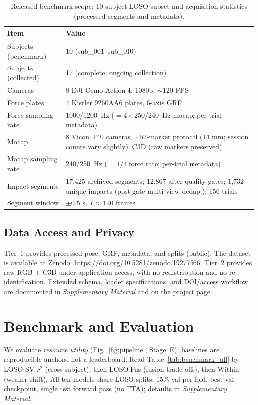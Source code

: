 \documentclass[sigconf,screen]{acmart}
\newcommand{\rateHz}[1]{\mbox{#1~Hz}}
\newcommand{\BadmintonGRFGitHubBase}{https://github.com/KenyaNiu/BadmintonGRF}
\newcommand{\BadmintonGRFRepoShort}{\href{\BadmintonGRFGitHubBase}{project page}}
\newcommand{\BadmintonGRFSupplementary}{\emph{Supplementary Material}}
\begin{document}
\begin{table}[t]
  \centering
  \small
  \setlength{\tabcolsep}{4pt}
  \renewcommand{\arraystretch}{1.05}
  \caption{Released benchmark scope: 10-subject LOSO subset and acquisition statistics (processed segments and metadata).}
  \label{tab:stats}
  \begin{tabularx}{\columnwidth}{@{}lX@{}}
    \toprule
    \textbf{Item} & \textbf{Value} \\
    \midrule
    Subjects (benchmark) & 10 (sub\_001--sub\_010) \\
    Subjects (collected) & 17 (complete; ongoing collection) \\
    Cameras & 8 DJI Osmo Action 4, 1080p, \(\sim\)120 FPS \\
    Force plates & 4 Kistler 9260AA6 plates, 6-axis GRF \\
    Force sampling rate & \rateHz{1000/1200} (\(=4\!\times\)\rateHz{250/240} mocap; per-trial metadata) \\
    Mocap & 8 Vicon T40 cameras, \(\sim\)52-marker protocol (14 mm; session counts vary slightly), C3D (raw markers preserved) \\
    Mocap sampling rate & \rateHz{240/250} (\(=1/4\) force rate; per-trial metadata) \\
    Impact segments & 17{,}425 archived segments; 12{,}867 after quality gates; 1{,}732 unique impacts (post-gate multi-view dedup.); 156 trials \\
    Segment window & \(\pm 0.5\) s, \(T\approx 120\) frames \\
    \bottomrule
  \end{tabularx}
\end{table}

\subsection{Data Access and Privacy}
Tier~1 provides processed pose, GRF, metadata, and splits (public).
The dataset is available at Zenodo: \url{https://doi.org/10.5281/zenodo.19277566}.
Tier~2 provides raw RGB + C3D under application access, with no redistribution and no re-identification.
Extended schema, loader specifications, and DOI/access workflow are documented in \BadmintonGRFSupplementary{} and on the \BadmintonGRFRepoShort.

\section{Benchmark and Evaluation}
\label{sec:benchmark_methods}
\label{sec:experiments}
\noindent We evaluate \emph{resource utility} (Fig.~\ref{fig:pipeline}, Stage~E): baselines are reproducible anchors, not a leaderboard. Read Table~\ref{tab:benchmark_all} by \textsc{LOSO} SV \(r^2\) (cross-subject), then \textsc{LOSO} Fus (fusion trade-offs), then Within (weaker shift). All ten models share LOSO splits, 15\% val per fold, best-val checkpoint, single test forward pass (no TTA); defaults in \BadmintonGRFSupplementary{}.
\end{document}
